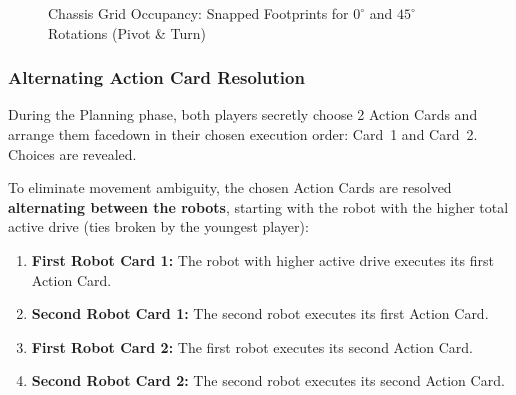 \documentclass[11pt,a4paper]{article}
\begin{document}
\begin{figure}[H]
{%
  }
  \caption{Chassis Grid Occupancy: Snapped Footprints for $0^\circ$ and $45^\circ$ Rotations (Pivot \& Turn)}
  \label{fig:diagram_chassis_45_occupancy}
\end{figure}

\subsubsection{Alternating Action Card Resolution}
During the Planning phase, both players secretly choose 2 Action Cards and arrange them facedown in their chosen execution order: Card~1 and Card~2. Choices are revealed.

To eliminate movement ambiguity, the chosen Action Cards are resolved \textbf{alternating between the robots}, starting with the robot with the higher total active drive (ties broken by the youngest player):
\begin{enumerate}[label=\arabic*., leftmargin=*, noitemsep, topsep=2pt]
  \item \textbf{First Robot Card 1:} The robot with higher active drive executes its first Action Card.
  \item \textbf{Second Robot Card 1:} The second robot executes its first Action Card.
  \item \textbf{First Robot Card 2:} The first robot executes its second Action Card.
  \item \textbf{Second Robot Card 2:} The second robot executes its second Action Card.
\end{enumerate}
\end{document}
